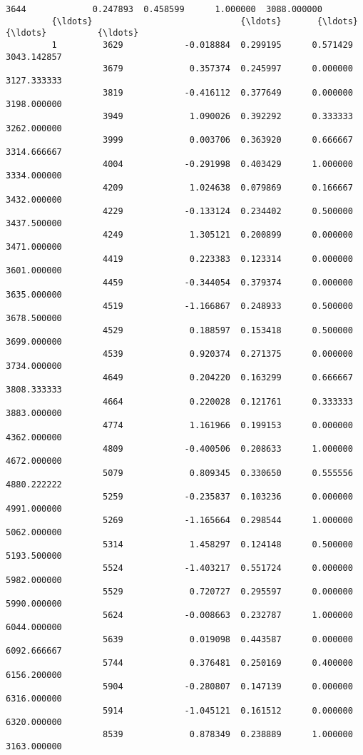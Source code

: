 \documentclass[11pt]{article}
\begin{document}
\begin{Verbatim}[commandchars=\\\{\}]
                   3644             0.247893  0.458599      1.000000  3088.000000   
         {\ldots}                             {\ldots}       {\ldots}           {\ldots}          {\ldots}   
         1         3629            -0.018884  0.299195      0.571429  3043.142857   
                   3679             0.357374  0.245997      0.000000  3127.333333   
                   3819            -0.416112  0.377649      0.000000  3198.000000   
                   3949             1.090026  0.392292      0.333333  3262.000000   
                   3999             0.003706  0.363920      0.666667  3314.666667   
                   4004            -0.291998  0.403429      1.000000  3334.000000   
                   4209             1.024638  0.079869      0.166667  3432.000000   
                   4229            -0.133124  0.234402      0.500000  3437.500000   
                   4249             1.305121  0.200899      0.000000  3471.000000   
                   4419             0.223383  0.123314      0.000000  3601.000000   
                   4459            -0.344054  0.379374      0.000000  3635.000000   
                   4519            -1.166867  0.248933      0.500000  3678.500000   
                   4529             0.188597  0.153418      0.500000  3699.000000   
                   4539             0.920374  0.271375      0.000000  3734.000000   
                   4649             0.204220  0.163299      0.666667  3808.333333   
                   4664             0.220028  0.121761      0.333333  3883.000000   
                   4774             1.161966  0.199153      0.000000  4362.000000   
                   4809            -0.400506  0.208633      1.000000  4672.000000   
                   5079             0.809345  0.330650      0.555556  4880.222222   
                   5259            -0.235837  0.103236      0.000000  4991.000000   
                   5269            -1.165664  0.298544      1.000000  5062.000000   
                   5314             1.458297  0.124148      0.500000  5193.500000   
                   5524            -1.403217  0.551724      0.000000  5982.000000   
                   5529             0.720727  0.295597      0.000000  5990.000000   
                   5624            -0.008663  0.232787      1.000000  6044.000000   
                   5639             0.019098  0.443587      0.000000  6092.666667   
                   5744             0.376481  0.250169      0.400000  6156.200000   
                   5904            -0.280807  0.147139      0.000000  6316.000000   
                   5914            -1.045121  0.161512      0.000000  6320.000000   
                   8539             0.878349  0.238889      1.000000  3163.000000   
         

\end{Verbatim}
\end{document}
